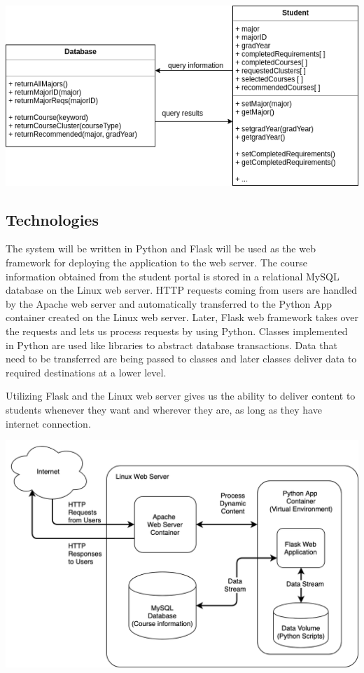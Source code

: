 \documentclass[a4paper, 11.5 pt, conference]{ieeeconf}  %
\begin{document}
\begingroup
    \medskip
    \centering
    \includegraphics[width=\columnwidth]{images/classEntity.png}
    \label{fig:fourth}
    \medskip
\endgroup


\subsection{Technologies}
The system will be written in Python and Flask will be used as the web framework for deploying the application to the web server. The course information obtained from the student portal is stored in a relational MySQL database on the Linux web server. HTTP requests coming from users are handled by the Apache web server and automatically transferred to the Python App container created on the Linux web server. Later, Flask web framework takes over the requests and lets us process requests by using Python. Classes implemented in Python are used like libraries to abstract database transactions. Data that need to be transferred are being passed to classes and later classes deliver data to required destinations at a lower level.

Utilizing Flask and the Linux web server gives us the ability to deliver content to students whenever they want and wherever they are, as long as they have internet connection.

\begingroup
    \medskip
    \centering
    \includegraphics[width=\columnwidth]{images/detailed-high-level-diagram.png}
    \label{fig:second}
    \medskip
\endgroup
\end{document}
